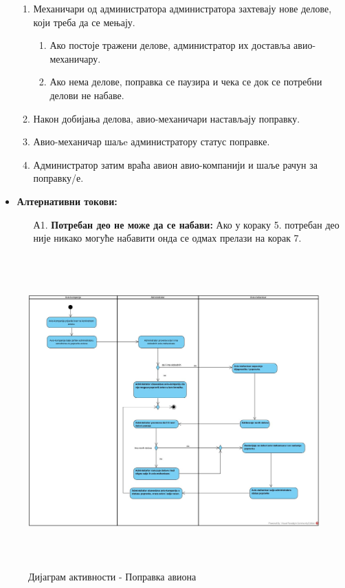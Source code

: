 \documentclass{article}
\begin{document}
\begin{itemize}
\begin{enumerate}
            \item Механичари од администратора администратора захтевају нове делове, који треба да се мењају.
                \begin{enumerate}
                    \item Ако постоје тражени делове, администратор их доставља авио-механичару.
                    \item Ако нема делове, поправка се паузира и чека се док се потребни делови не набаве.
                \end{enumerate}
            \item Након добијања делова, авио-механичари настављају поправку.
            \item Авио-механичар шаљe администратору статус поправке.
            \item Администратор затим враћа авион авио-компанији и шаље рачун за поправку/е.
        \end{enumerate}
        
        \item \textbf{Алтернативни токови:}
            \begin{itemize}
                \item[А1.] \textbf{Потребан део не може да се набави:} Ако у кораку 5. потребан део није никако могуће набавити онда се одмах прелази на корак 7.
            \end{itemize}
\end{itemize}

\begin{figure}[H]
    \begin{center}
        \includegraphics[width=1.1\textwidth, height=12cm]{Dijagrami_slike/popravka_aviona.jpg}
        \caption{Дијаграм активности - Поправка авиона}
    \end{center}
\end{figure}
\end{document}
